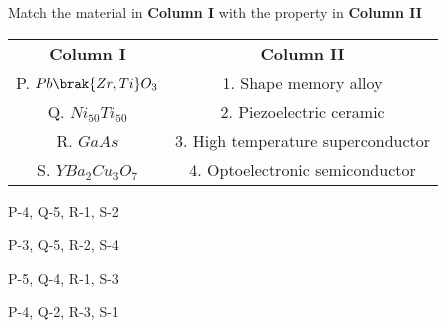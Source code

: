     \item Match the material in \textbf{Column I} with the property in \textbf{Column II}
        \begin{center}
            \begin{tabular}{| c | c |}
                \hline
                \textbf{Column I} & \textbf{Column II}\\
                P. $Pb\brak{Zr, Ti}O_3$ & 1. Shape memory alloy\\
                \hline
                Q. $Ni_{50}Ti_{50} $ & 2. Piezoelectric ceramic\\
                \hline
                R. $GaAs$ & 3. High temperature superconductor\\
                \hline
                S. $YBa_2Cu_3O_7$ & 4. Optoelectronic semiconductor\\
                \hline
            \end{tabular} 
        \end{center}


        \hfill{}
        \begin{enumerate}
                \begin{multicols}{2}
                \item P-4, Q-5, R-1, S-2 \columnbreak 
                \item P-3, Q-5, R-2, S-4 
                \end{multicols} 
                \begin{multicols}{2}
                \item P-5, Q-4, R-1, S-3 \columnbreak 
                \item P-4, Q-2, R-3, S-1
                \end{multicols}
        \end{enumerate}

        \hfill{}

